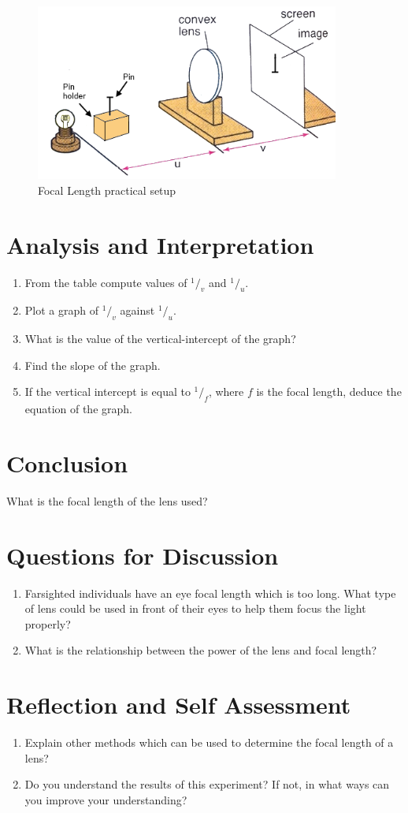 \begin{figure}[h!]
\centering
\includegraphics[width=10cm]{./img/focal-length-1.png}
\caption{Focal Length practical setup}
\label{fig:focal-length-1}
\end{figure}

\section{Analysis and Interpretation}
\begin{enumerate}
\item From the table compute values of $^1/_v$ and $^1/_u$.
\item Plot a graph of $^1/_v$ against $^1/_u$.
\item What is the value of the vertical-intercept of the graph?
\item Find the slope of the graph.
\item If the vertical intercept is equal to $^1/_f$, where $f$ is the focal length, deduce the equation of the graph.
\end{enumerate}

\section{Conclusion}
What is the focal length of the lens used?

\section{Questions for Discussion}
\begin{enumerate}
\item Farsighted individuals have an eye focal length which is too long. What type of lens could be used in front of their eyes to help them focus the light properly?
\item What is the relationship between the power of the lens and focal length?
\end{enumerate}

\section{Reflection and Self Assessment}
\begin{enumerate}
\item Explain other methods which can be used to determine the focal length of a lens?
\item Do you understand the results of this experiment? If not, in what ways can you improve your understanding?
\end{enumerate}